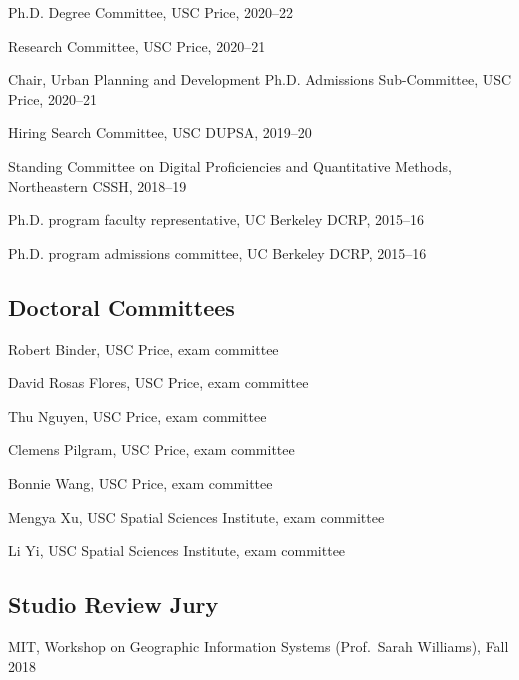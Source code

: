 \documentclass[12pt,letterpaper]{report}
\newcommand{\listitemspace}{0.25em}
\renewenvironment{itemize}
{\begin{list}{}{\setlength{\leftmargin}{0em}
                \setlength{\parskip}{0em}
                \setlength{\itemsep}{\listitemspace}
                \setlength{\parsep}{\listitemspace}}}
{\end{list}}
\begin{document}
    \begin{itemize}

        \item Ph.D. Degree Committee, USC Price, 2020--22
        \item Research Committee, USC Price, 2020--21
        \item Chair, Urban Planning and Development Ph.D. Admissions Sub-Committee, USC Price, 2020--21
        \item Hiring Search Committee, USC DUPSA, 2019--20
        \item Standing Committee on Digital Proficiencies and Quantitative Methods, Northeastern CSSH, 2018--19
        \item Ph.D. program faculty representative, UC Berkeley DCRP, 2015--16
        \item Ph.D. program admissions committee, UC Berkeley DCRP, 2015--16

    \end{itemize}

    \subsection*{Doctoral Committees}

    \begin{itemize}

        \item Robert Binder, USC Price, exam committee
        \item David Rosas Flores, USC Price, exam committee
        \item Thu Nguyen, USC Price, exam committee
        \item Clemens Pilgram, USC Price, exam committee
        \item Bonnie Wang, USC Price, exam committee
        \item Mengya Xu, USC Spatial Sciences Institute, exam committee
        \item Li Yi, USC Spatial Sciences Institute, exam committee

    \end{itemize}

    \subsection*{Studio Review Jury}

    \begin{itemize}

        \item MIT, Workshop on Geographic Information Systems (Prof.\ Sarah Williams), Fall 2018

    \end{itemize}
\end{document}
